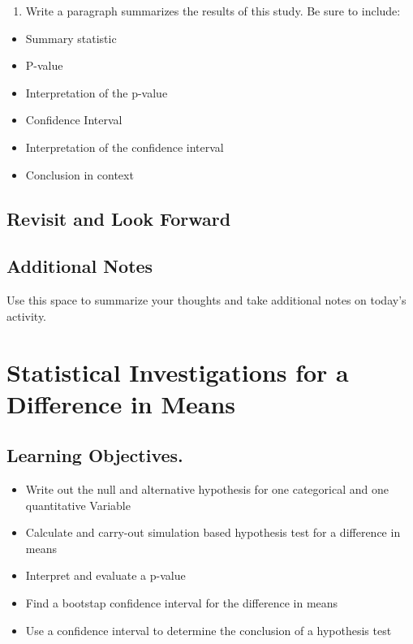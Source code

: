\documentclass[
]{report}
\providecommand{\tightlist}{%
  \setlength{\itemsep}{0pt}\setlength{\parskip}{0pt}}
\begin{document}
\begin{enumerate}
\def\labelenumi{\arabic{enumi}.}
\setcounter{enumi}{18}
\tightlist
\item
  Write a paragraph summarizes the results of this study. Be sure to include:
\end{enumerate}

\begin{itemize}
\item
  Summary statistic
\item
  P-value
\item
  Interpretation of the p-value
\item
  Confidence Interval
\item
  Interpretation of the confidence interval
\item
  Conclusion in context
\end{itemize}

\vspace{3in}

\hypertarget{revisit-and-look-forward-1}{%
\section{Revisit and Look Forward}\label{revisit-and-look-forward-1}}

\hypertarget{additional-notes-7}{%
\section{Additional Notes}\label{additional-notes-7}}

Use this space to summarize your thoughts and take additional notes on today's activity.

\hypertarget{statistical-investigations-for-a-difference-in-means}{%
\chapter{Statistical Investigations for a Difference in Means}\label{statistical-investigations-for-a-difference-in-means}}

\hypertarget{learning-objectives.-1}{%
\section{Learning Objectives.}\label{learning-objectives.-1}}

\begin{itemize}
\item
  Write out the null and alternative hypothesis for one categorical and one quantitative Variable
\item
  Calculate and carry-out simulation based hypothesis test for a difference in means
\item
  Interpret and evaluate a p-value
\item
  Find a bootstap confidence interval for the difference in means
\item
  Use a confidence interval to determine the conclusion of a hypothesis test
\end{itemize}
\end{document}
